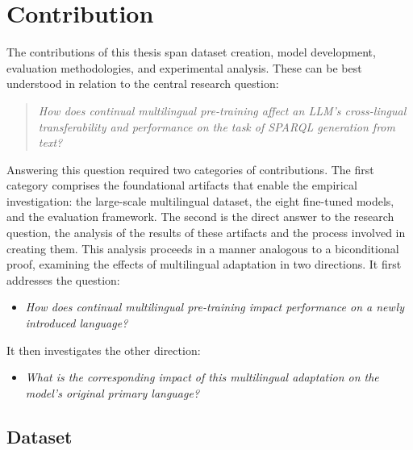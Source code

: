 \section{Contribution}\label{section::contribution}
The contributions of this thesis span dataset creation, model development, evaluation methodologies, and experimental analysis. These can be best understood in relation to the central research question:
\begin{quote}
\textit{How does continual multilingual pre-training affect an LLM's cross-lingual transferability and performance on the task of SPARQL generation from text?}
\end{quote}
Answering this question required two categories of contributions. 
The first category comprises the foundational artifacts that enable the empirical investigation: the large-scale multilingual dataset, the eight fine-tuned models, and the evaluation framework. 
The second is the direct answer to the research question, the analysis of the results of these artifacts and the process involved in creating them. 
This analysis proceeds in a manner analogous to a biconditional proof, examining the effects of multilingual adaptation in two directions. It first addresses the question:
\begin{itemize}
    \item \textit{How does continual multilingual pre-training impact performance on a newly introduced language?}
\end{itemize}
It then investigates the other direction:
\begin{itemize}
    \item \textit{What is the corresponding impact of this multilingual adaptation on the model's original primary language?}
\end{itemize}

\subsection{Dataset}

